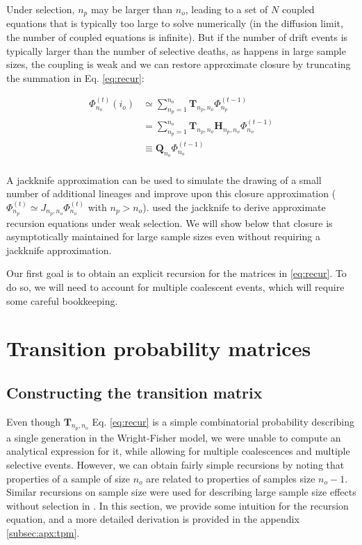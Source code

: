 \documentclass[review]{elsarticle}
\newcommand{\afs}[2]{\Phi_{#1}^{(#2)}}
\begin{document}
Under selection, $n_{p}$ may be larger than $n_o$, leading to a set of $N$ coupled equations that is
typically too large to solve numerically (in the diffusion limit, the number of coupled equations is
infinite). But if the number of drift events is typically larger than the number of selective
deaths, as happens in large sample sizes, the coupling is weak and we can restore approximate
closure by truncating the summation in Eq. \ref{eq:recur}:

\begin{equation}
\begin{split}
  \afs{n_o}{t}(i_o)
  &\simeq \sum_{n_p=1}^{n_{o}} \mathbf{T}_{n_p,n_o}                      \afs{n_p}{t-1}\\
  &=      \sum_{n_p=1}^{n_{o}} \mathbf{T}_{n_p,n_o} \mathbf{H}_{n_p,n_o} \afs{n_o}{t-1}\\
  &\equiv \mathbf{Q}_{n_o}                                               \afs{n_o}{t-1}\\
\end{split}
\label{eq:truncated}
\end{equation}

A jackknife approximation \citep{Gravel2016} can be used to simulate the drawing of a small number
of additional lineages and improve upon this closure approximation
($\afs{n_p}{t} \simeq J_{n_p,n_o} \afs{n_o}{t}$ with $n_p>n_o$). \cite{JouganousEtAl2017} used the
jackknife to derive approximate recursion equations under weak selection. We will show below that
closure is asymptotically maintained for large sample sizes even without requiring a jackknife
approximation.

Our first goal is to obtain an explicit recursion for the matrices in \eqref{eq:recur}. To do so, we
will need to account for multiple coalescent events, which will require some careful bookkeeping.

\section{Transition probability matrices}
\label{sec:trans-mat}

\subsection{Constructing the transition matrix}
\label{subsec:trans-mat}

Even though $\mathbf{T}_{n_p,n_o}$ Eq. \ref{eq:recur} is a simple combinatorial probability
describing a single generation in the Wright-Fisher model, we were unable to compute an analytical
expression for it, while allowing for multiple coalescences and multiple selective events. However,
we can obtain fairly simple recursions by noting that properties of a sample of size $n_o$ are
related to properties of samples size $n_o-1.$ Similar recursions on sample size were used for
describing large sample size effects without selection in \citep{BhaskarEtAl2014}. In this section,
we provide some intuition for the recursion equation, and a more detailed derivation is provided in
the appendix \ref{subsec:apx:tpm}.
\end{document}

